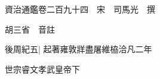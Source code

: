






























































資治通鑑卷二百九十四　宋　司馬光　撰

胡三省　音註

後周紀五|{
	起著雍敦牂盡屠維栛洽凡二年}


世宗睿文孝武皇帝下

